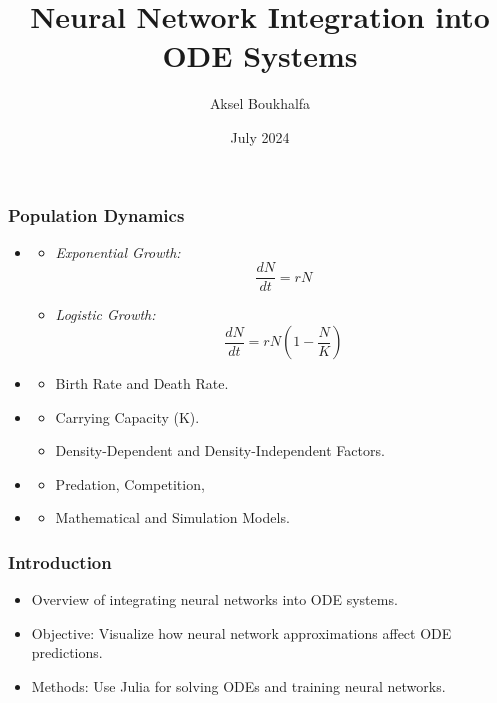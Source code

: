 \documentclass[aspectratio=169]{beamer}
\title{Neural Network Integration into ODE Systems}
\author{Aksel Boukhalfa}
\date{July 2024}
\begin{document}
\begin{frame}
  \titlepage
\end{frame}

\begin{frame}
  \frametitle{Population Dynamics}

  \begin{itemize}   
    \item {}
      \begin{itemize}
        \item \textit{Exponential Growth:}
          \[
          \frac{dN}{dt} = rN
          \]
        \item \textit{Logistic Growth:}
          \[
          \frac{dN}{dt} = rN \left(1 - \frac{N}{K}\right)
          \]
      \end{itemize}

    \item {}
      \begin{itemize}
        \item Birth Rate and Death Rate.
      \end{itemize}

    \item {}
      \begin{itemize}
        \item Carrying Capacity (K).
        \item Density-Dependent and Density-Independent Factors.
      \end{itemize}

    \item {}
      \begin{itemize}
        \item Predation, Competition, 
      \end{itemize}
    \item {}
      \begin{itemize}
        \item Mathematical and Simulation Models.
      \end{itemize}
  \end{itemize}

\end{frame}


\begin{frame}
  \frametitle{Introduction}
  \begin{itemize}
    \item Overview of integrating neural networks into ODE systems.
    \item Objective: Visualize how neural network approximations affect ODE predictions.
    \item Methods: Use Julia for solving ODEs and training neural networks.
  \end{itemize}
\end{frame}
\end{document}
